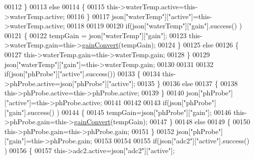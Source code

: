 \begin{DoxyCode}
00112             \}
00113             \textcolor{keywordflow}{else}
00114             \{
00115                 this->waterTemp.active=this->waterTemp.active;
00116             \}
00117             json[\textcolor{stringliteral}{"waterTemp"}][\textcolor{stringliteral}{"active"}]=this->waterTemp.active;
00118 
00119             
00120             \textcolor{keywordflow}{if}(json[\textcolor{stringliteral}{"waterTemp"}][\textcolor{stringliteral}{"gain"}].success() )
00121             \{           
00122                 tempGain = json[\textcolor{stringliteral}{"waterTemp"}][\textcolor{stringliteral}{"gain"}]; 
00123                 this->waterTemp.gain=this->\hyperlink{class_irene3000_abcad62d1201a59f8dd3ba87048002728}{gainConvert}(tempGain);
00124             \}
00125             \textcolor{keywordflow}{else}
00126             \{
00127                 this->waterTemp.gain=this->waterTemp.gain;
00128             \}
00129             json[\textcolor{stringliteral}{"waterTemp"}][\textcolor{stringliteral}{"gain"}]=this->waterTemp.gain;
00130 
00131             
00132             \textcolor{keywordflow}{if}(json[\textcolor{stringliteral}{"phProbe"}][\textcolor{stringliteral}{"active"}].success())
00133             \{
00134                 this->phProbe.active=json[\textcolor{stringliteral}{"phProbe"}][\textcolor{stringliteral}{"active"}];
00135             \}
00136             \textcolor{keywordflow}{else}
00137             \{
00138                 this->phProbe.active=this->phProbe.active;
00139             \}
00140             json[\textcolor{stringliteral}{"phProbe"}][\textcolor{stringliteral}{"active"}]=this->phProbe.active;
00141     
00142             
00143             \textcolor{keywordflow}{if}(json[\textcolor{stringliteral}{"phProbe"}][\textcolor{stringliteral}{"gain"}].success() )
00144             \{       
00145                 tempGain=json[\textcolor{stringliteral}{"phProbe"}][\textcolor{stringliteral}{"gain"}];
00146                 this->phProbe.gain=this->\hyperlink{class_irene3000_abcad62d1201a59f8dd3ba87048002728}{gainConvert}(tempGain);          
00147             \}
00148             \textcolor{keywordflow}{else}
00149             \{
00150                 this->phProbe.gain=this->phProbe.gain;
00151             \}
00152             json[\textcolor{stringliteral}{"phProbe"}][\textcolor{stringliteral}{"gain"}]=this->phProbe.gain;
00153 
00154             
00155             \textcolor{keywordflow}{if}(json[\textcolor{stringliteral}{"adc2"}][\textcolor{stringliteral}{"active"}].success() )
00156             \{
00157                 this->adc2.active=json[\textcolor{stringliteral}{"adc2"}][\textcolor{stringliteral}{"active"}];

\end{DoxyCode}
